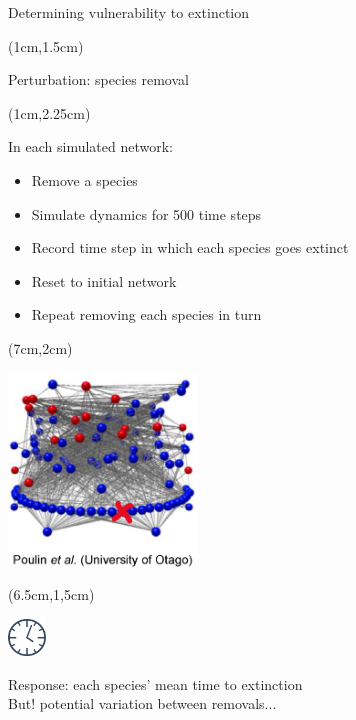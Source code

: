 \documentclass{beamer}
\newcommand*\whitem{%
  \item[\color{white}\scalebox{0.9}{\textbullet}]}
\begin{document}
  \begin{frame}{Determining vulnerability to extinction}
    \begin{textblock*}{7cm}(1cm,1.5cm)

      {\color{DarkBlue}Perturbation: species removal}

    \end{textblock*}

    \begin{textblock*}{5cm}(1cm,2.25cm) 

      {\color{DarkBlue}In each simulated network:}

      \begin{itemize}
        \item Remove a species
        \item Simulate dynamics for 500 time steps
        \item Record time step in which each species goes extinct
        \whitem {\color{white}Reset to initial network}
        \whitem {\color{white}Repeat removing each species in turn}

      \end{itemize}

      \end{textblock*}

    \begin{textblock*}{5cm}(7cm,2cm)

      \includegraphics[width=5cm]{intro_figs/Otagoweb_remove3.eps}

      \end{textblock*}

    \begin{textblock*}{1cm}(6.5cm,1,5cm)

      \includegraphics[width=1cm]{intro_figs/clock.eps}

      \end{textblock*}

    {\color{white} Response: each species' mean time to extinction\\
    But! potential variation between removals...}

    \end{frame}
\end{document}
